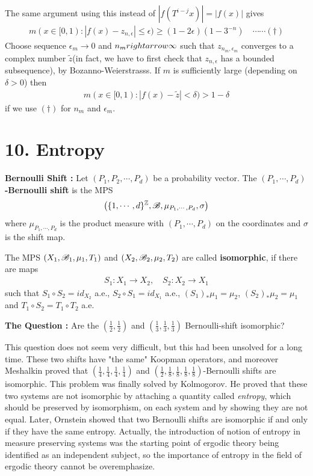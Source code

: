 \documentclass[12pt,a4paper]{report}
\begin{document}
\quad The same argument using this instead of $|f(T^{i-j}x)| = |f(x)|$ gives
\begin{align*}
m(x\in [0,1) : |f(x) - z_{n,\epsilon} | \leq \epsilon ) \geq (1-2\epsilon) (1-3^{-n}) \quad \cdots\cdots (\dagger)
\end{align*}
Choose sequence $\epsilon_m\rightarrow 0$ and $n_m\\rightarrow \infty$ such that $z_{n_m, \epsilon_m}$ converges to a complex number $\tilde{z}$(in fact, we have to first check that $z_{n,\epsilon}$ has a bounded subsequence), by Bozanno-Weierstrasss. If $m$ is sufficiently large (depending on $\delta >0$) then
\begin{align*}
m(x\in [0,1) : |f(x)-\tilde{z}| < \delta ) > 1-\delta
\end{align*}
if we use $(\dagger)$ for $n_m$ and $\epsilon_m$.

\section*{10. Entropy}

\textbf{Bernoulli Shift : } Let $(P_1, P_2,\cdots, P_d)$ be a probability vector. The \textbf{$(P_1, \cdots, P_d)$-Bernoulli shift} is the MPS
\begin{align*}
\big( \{1,\cdots, d\}^{\mathbb{Z}}, \mathscr{B}, \mu_{P_1,\cdots, P_d},\sigma \big)
\end{align*}
where $\mu_{P_1,\cdots, P_d}$ is the product measure with $(P_1,\cdots, P_d)$ on the coordinates and $\sigma$ is the shift map.
\s

 The MPS $(X_1, \mathscr{B}_1, \mu_1, T_1)$ and $(X_2,\mathscr{B}_2, \mu_2, T_2)$ are called \textbf{isomorphic}, if there are maps
\begin{align*}
S_1 : X_1\rightarrow X_2,\quad S_2 : X_2 \rightarrow X_1
\end{align*}
such that $S_1 \circ S_2 = id_{X_2}$ a.e., $S_2 \circ S_1 = id_{X_1}$ a.e., $(S_1)_* \mu_1 =\mu_2$, $(S_2)_* \mu_2 =\mu_1$ and $T_1 \circ S_2 = T_1 \circ T_2$ a.e.
\s

\textbf{The Question :} Are the $(\frac{1}{2}, \frac{1}{2})$ and $(\frac{1}{3},\frac{1}{3},\frac{1}{3})$ Bernoulli-shift isomorphic?
\s

This question does not seem very difficult, but this had been unsolved for a long time. These two shifts have "the same" Koopman operators, and moreover Meshalkin proved that $(\frac{1}{4},\frac{1}{4},\frac{1}{4},\frac{1}{4})$ and $(\frac{1}{2},\frac{1}{8},\frac{1}{8},\frac{1}{8},\frac{1}{8})$-Bernoulli shifts are isomorphic. This problem was finally solved by Kolmogorov. He proved that these two systems are not isomorphic by attaching a quantity called \emph{entropy}, which should be preserved by isomorphism, on each system and by showing they are not equal. Later, Ornstein showed that two Bernoulli shifts are isomorphic if and only if they have the same entropy. Actually, the introduction of notion of entropy in measure preserving systems was the starting point of ergodic theory being identified as an independent subject, so the importance of entropy in the field of ergodic theory cannot be overemphasize.
\s
\end{document}
